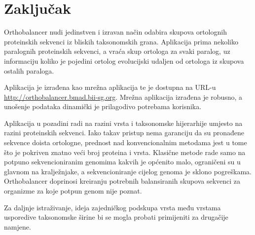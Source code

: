 \chapter{Zaključak}
\label{chap:zakljucak}

Orthobalancer nudi jedinstven i izravan način odabira skupova ortolognih
proteinskih sekvenci iz bliskih taksonomskih grana. Aplikacija prima nekoliko
paralognih proteinskih sekvenci, a vraća skup ortologa za svaki paralog, uz
informaciju koliko je pojedini ortolog evolucijski udaljen od ortologa iz
skupova ostalih paraloga.

Aplikacija je izrađena kao mrežna aplikacija te je dostupna na URL-u
\footnotesize{\url{http://orthobalancer.bmad.bii-sg.org}}. \normalsize
Mrežna aplikacija izrađena je robusno, a unošenje podataka dinamički je
prilagodivo potrebama korisnika.

Aplikacija u pozadini radi na razini vrsta i taksonomske hijerarhije umjesto na
razini proteinskih sekvenci. Iako takav pristup nema garanciju da su pronađene
sekvence doista ortologne, prednost nad konvencionalnim metodama jest u tome što
je pokriven znatno veći broj proteina i vrsta. Klasične metode rade samo na
potpuno sekvencioniranim genomima kakvih je općenito malo, ograničeni su u
glavnom na kralježnjake, a sekvencioniranje cijelog genoma je sklono pogreškama.
Orthobalancer doprinosi kreiranju potrebnih balansiranih skupova sekvenci za
organizme za koje potpun genom nije poznat.

Za daljnje istraživanje, ideja zajedničkog podskupa vrsta među vrstama
usporedive taksonomske širine bi se mogla probati primijeniti za drugačije
namjene.

